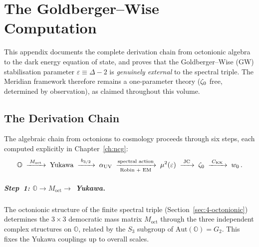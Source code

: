 
\chapter{The Goldberger--Wise Computation}
\label{app:gw}

This appendix documents the complete derivation chain from octonionic algebra to the dark energy equation of state, and proves that the Goldberger--Wise (GW) stabilisation parameter $\varepsilon \equiv \Delta - 2$ is \emph{genuinely external} to the spectral triple.  The Meridian framework therefore remains a one-parameter theory ($\zeta_0$ free, determined by observation), as claimed throughout this volume.

\section{The Derivation Chain}
\label{app:gw-chain}

The algebraic chain from octonions to cosmology proceeds through six steps, each computed explicitly in Chapter~\ref{ch:ncg}:
\begin{equation}
  \mathbb{O} \;\xrightarrow{\;M_\mathrm{oct}\;}\; \text{Yukawa}
  \;\xrightarrow{\;b_{3/2}\;}\; \alpha_\mathrm{UV}
  \;\xrightarrow[\text{Robin + EM}]{\text{spectral action}}\; \mu^2(\varepsilon)
  \;\xrightarrow{\;\text{JC}\;}\; \zeta_0
  \;\xrightarrow{\;C_\mathrm{KK}\;}\; w_0\,.
  \label{eq:E-chain}
\end{equation}

\paragraph{Step~1: $\mathbb{O} \to M_\mathrm{oct} \to$ Yukawa.}
The octonionic structure of the finite spectral triple (Section~\ref{sec:4-octonionic}) determines the $3 \times 3$ democratic mass matrix $M_\mathrm{oct}$ through the three independent complex structures on $\mathbb{O}$, related by the $S_3$ subgroup of $\mathrm{Aut}(\mathbb{O}) = G_2$.  This fixes the Yukawa couplings up to overall scales.

